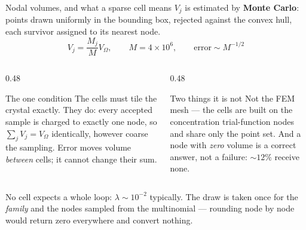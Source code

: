 \documentclass[aspectratio=169,10pt]{beamer}
\newcommand{\foot}[1]{\par\vspace{1ex}%
  \begingroup\footnotesize\raggedright #1\par\endgroup}
\begin{document}
\begin{frame}{Nodal volumes, and what a sparse cell means}
\small
$V_j$ is estimated by \textbf{Monte Carlo}: points drawn uniformly in the
bounding box, rejected against the convex hull, each survivor assigned to its
nearest node.
\[
  V_j=\frac{M_j}{M}V_\Omega,\qquad M=4\times10^{6},\qquad
  \text{error}\sim M^{-1/2}
\]
\begin{columns}[T]
\begin{column}{0.48\textwidth}
\begin{block}{The one condition}\small
The cells must tile the crystal exactly. They do: every accepted sample is
charged to exactly one node, so $\sum_jV_j=V_\Omega$ identically, however
coarse the sampling. Error moves volume \emph{between} cells; it cannot change
their sum.
\end{block}
\end{column}
\begin{column}{0.48\textwidth}
\begin{block}{Two things it is not}\small
Not the FEM mesh --- the cells are built on the concentration trial-function
nodes and share only the point set. And a node with \emph{zero} volume is a
correct answer, not a failure: $\sim12\%$ receive none.
\end{block}
\end{column}
\end{columns}
\vspace{0.5ex}
\foot{No cell expects a whole loop: $\lambda\sim10^{-2}$ typically. The draw is
taken once for the \emph{family} and the nodes sampled from the multinomial ---
rounding node by node would return zero everywhere and convert nothing.}
\end{frame}
\end{document}
